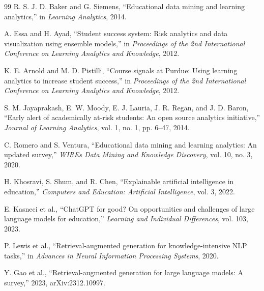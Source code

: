 \documentclass[12pt,a4paper,oneside]{report}
\begin{document}
\begin{thebibliography}{99}
R. S. J. D. Baker and G. Siemens, ``Educational data mining and learning analytics,'' in \emph{Learning Analytics}, 2014.

A. Essa and H. Ayad, ``Student success system: Risk analytics and data visualization using ensemble models,'' in \emph{Proceedings of the 2nd International Conference on Learning Analytics and Knowledge}, 2012.

K. E. Arnold and M. D. Pistilli, ``Course signals at Purdue: Using learning analytics to increase student success,'' in \emph{Proceedings of the 2nd International Conference on Learning Analytics and Knowledge}, 2012.

S. M. Jayaprakash, E. W. Moody, E. J. Lauria, J. R. Regan, and J. D. Baron, ``Early alert of academically at-risk students: An open source analytics initiative,'' \emph{Journal of Learning Analytics}, vol. 1, no. 1, pp. 6--47, 2014.

C. Romero and S. Ventura, ``Educational data mining and learning analytics: An updated survey,'' \emph{WIREs Data Mining and Knowledge Discovery}, vol. 10, no. 3, 2020.

H. Khosravi, S. Shum, and R. Chen, ``Explainable artificial intelligence in education,'' \emph{Computers and Education: Artificial Intelligence}, vol. 3, 2022.

E. Kasneci et al., ``ChatGPT for good? On opportunities and challenges of large language models for education,'' \emph{Learning and Individual Differences}, vol. 103, 2023.

P. Lewis et al., ``Retrieval-augmented generation for knowledge-intensive NLP tasks,'' in \emph{Advances in Neural Information Processing Systems}, 2020.

Y. Gao et al., ``Retrieval-augmented generation for large language models: A survey,'' 2023, arXiv:2312.10997.
\end{thebibliography}

\appendix








\end{document}
